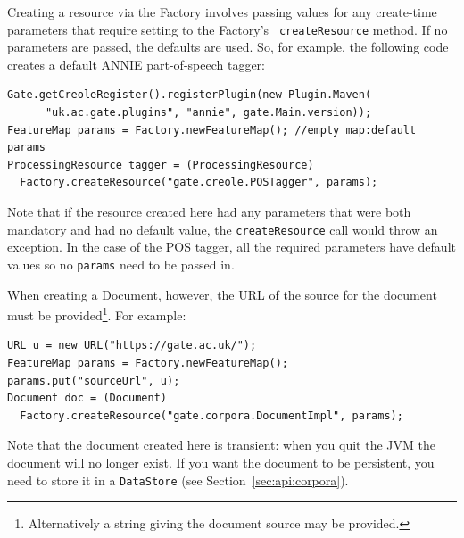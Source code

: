 



Creating a resource via the Factory involves passing values for any
create-time parameters that require setting to the Factory's {\tt
createResource} method. If no parameters are passed, the defaults are used.
So, for example, the following code creates a default ANNIE part-of-speech
tagger:
%
\begin{lstlisting}
Gate.getCreoleRegister().registerPlugin(new Plugin.Maven(
      "uk.ac.gate.plugins", "annie", gate.Main.version));
FeatureMap params = Factory.newFeatureMap(); //empty map:default params
ProcessingResource tagger = (ProcessingResource)
  Factory.createResource("gate.creole.POSTagger", params);
\end{lstlisting}
%
Note that if the resource created here had any parameters that were both
mandatory and had no default value, the {\tt createResource} call would throw
an exception.  In the case of the POS tagger, all the required parameters have
default values so no \texttt{params} need to be passed in.

When creating a Document, however, the URL of the source for the document must be
provided\footnote{Alternatively a string giving the document source may be
provided.}. For example:
\begin{lstlisting}
URL u = new URL("https://gate.ac.uk/");
FeatureMap params = Factory.newFeatureMap();
params.put("sourceUrl", u);
Document doc = (Document)
  Factory.createResource("gate.corpora.DocumentImpl", params);
\end{lstlisting}
%
Note that the document created here is transient: when you quit the JVM the
document will no longer exist. If you want the document to be persistent, you need to
store it in a {\tt DataStore} (see Section~\ref{sec:api:corpora}).

